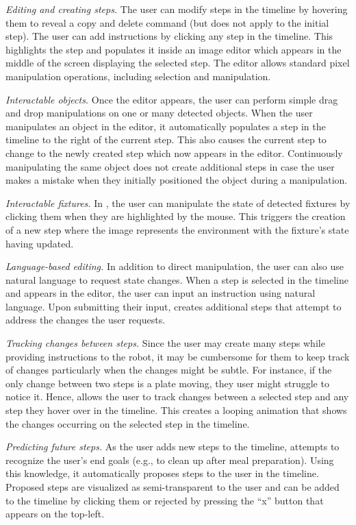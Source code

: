 \emph{Editing and creating steps.} The user can modify steps in the timeline by hovering them to reveal a copy and delete command (but does not apply to the initial step). The user can add instructions by clicking any step in the timeline. This highlights the step and populates it inside an image editor which appears in the middle of the screen displaying the selected step. The editor allows standard pixel manipulation operations, including selection and manipulation.

\emph{Interactable objects.} Once the editor appears, the user can perform simple drag and drop manipulations on one or many detected objects. When the user manipulates an object in the editor, it automatically populates a step in the timeline to the right of the current step. This also causes the current step to change to the newly created step which now appears in the editor. Continuously manipulating the same object does not create additional steps in case the user makes a mistake when they initially positioned the object during a manipulation.

\emph{Interactable fixtures.} In \projname, the user can manipulate the state of detected fixtures by clicking them when they are highlighted by the mouse. This triggers the creation of a new step where the image represents the environment with the fixture's state having updated.

\emph{Language-based editing.} In addition to direct manipulation, the user can also use natural language to request state changes. When a step is selected in the timeline and appears in the editor, the user can input an instruction using natural language. Upon submitting their input, \projname creates additional steps that attempt to address the changes the user requests. 

\emph{Tracking changes between steps.} Since the user may create many steps while providing instructions to the robot, it may be cumbersome for them to keep track of changes particularly when the changes might be subtle. For instance, if the only change between two steps is a plate moving, they user might struggle to notice it. Hence, \projname allows the user to track changes between a selected step and any step they hover over in the timeline. This creates a looping animation that shows the changes occurring on the selected step in the timeline.

\emph{Predicting future steps.} As the user adds new steps to the timeline, \projname attempts to recognize the user's end goals (e.g., to clean up after meal preparation). Using this knowledge, it automatically proposes steps to the user in the timeline. Proposed steps are visualized as semi-transparent to the user and can be added to the timeline by clicking them or rejected by pressing the ``x'' button that appears on the top-left. 

